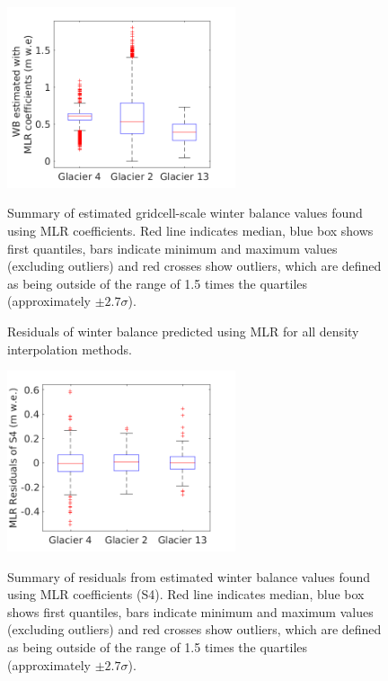 \documentclass{sfuthesis}
\newcommand{\boxMatlab}{Red line indicates median, blue box shows first quantiles, bars indicate minimum and maximum values (excluding outliers) and red crosses show outliers, which are defined as being outside of the range of 1.5 times the quartiles (approximately $\pm2.7\sigma$). }
\begin{document}
\begin{figure}[H]
\centering
	\includegraphics[width =0.6\textwidth]{ModelledSWE_box_MLR.png}\\
\caption{Summary of estimated gridcell-scale winter balance values found using MLR coefficients. \boxMatlab}
\label{fig:MLRsweboxplot}
\end{figure} 


\begin{figure}[H]
	\caption{Residuals of winter balance predicted using MLR for all density interpolation methods.}
	\label{fig:MLRresiduals_all}
\end{figure}

\begin{figure}[H]
\centering
	\includegraphics[width =0.6\textwidth]{residuals_box_MLR.png}\\
\caption{Summary of residuals from estimated winter balance values found using MLR coefficients (S4). \boxMatlab}
\label{fig:MLRresidualsboxplot}
\end{figure} 
\end{document}
